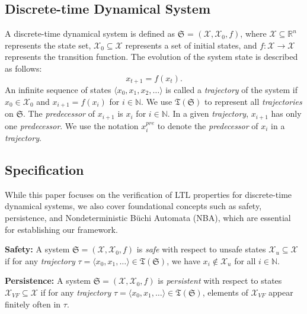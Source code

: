 \subsection{Discrete-time Dynamical System}
\label{dtds}
A discrete-time dynamical system is defined as $\mathfrak{S}$ = $(\mathcal{X}, \mathcal{X}_0, f)$, where $\mathcal{X} \subseteq \mathbb{R}^n$ represents the state set, $\mathcal{X}_{0} \subseteq \mathcal{X}$ represents a set of initial states, and $f: \mathcal{X} \rightarrow \mathcal{X}$ represents the transition function. The evolution of the system state is described as follows:
\[
  x_{t+1} = f(x_t).
\]
An infinite sequence of states $\langle x_0, x_1, x_2, \dots \rangle$ is called a \emph{trajectory} of the system if $x_0 \in \mathcal{X}_0$ and $x_{i+1} = f(x_{i})$ for $i \in \mathbb{N}$. We use $\mathfrak{T}(\mathfrak{S})$ to represent all \emph{trajectories} on $\mathfrak{S}$. The \emph{predecessor} of \(x_{i+1}\) is \(x_i\) for \(i \in \mathbb{N}\). In a given \emph{trajectory}, \(x_{i+1}\) has only one \emph{predecessor}. We use the notation \(x_{i}^{pre}\) to denote the \emph{predecessor} of \(x_{i}\) in a \emph{trajectory}.
\subsection{Specification}
\label{specification123}
While this paper focuses on the verification of LTL properties for discrete-time dynamical systems, we also cover foundational concepts such as safety, persistence, and Nondeterministic Büchi Automata (NBA), which are essential for establishing our framework.

\textbf{Safety:} A system $\mathfrak{S}=(\mathcal{X}, \mathcal{X}_0, f)$ is \emph{safe} with respect to unsafe states $\mathcal{X}_u \subseteq \mathcal{X}$ if for any \emph{trajectory} $\tau = \langle x_0, x_1, \dots \rangle \in \mathfrak{T}(\mathfrak{S})$, we have $x_i \not\in \mathcal{X}_u$ for all $i \in \mathbb{N}$.

\textbf{Persistence:} A system $\mathfrak{S}=(\mathcal{X}, \mathcal{X}_0, f)$ is \emph{persistent} with respect to states $\mathcal{X}_{VF} \subseteq \mathcal{X}$ if for any \emph{trajectory} $\tau = \langle x_0, x_1, \dots \rangle \in \mathfrak{T}(\mathfrak{S})$, elements of $\mathcal{X}_{VF}$ appear finitely often in $\tau$.

